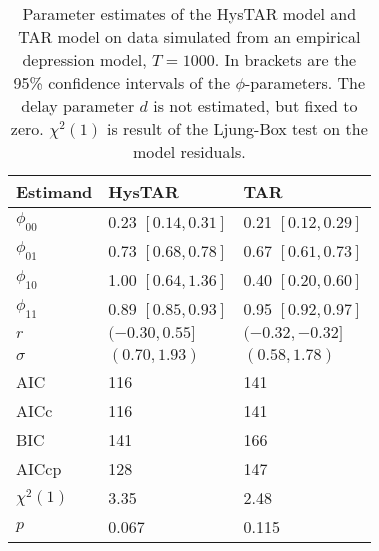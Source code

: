 \begin{table}[h!]
\begin{center}
\begin{tabular}{ l l l }
\hline
Estimand & HysTAR & TAR \\ \hline
$\phi_{00}$ 	& 0.23 $[0.14, 0.31]$ 	& 0.21 $[0.12, 0.29]$ 	\\
$\phi_{01}$ 	& 0.73 $[0.68, 0.78]$ 	& 0.67 $[0.61, 0.73]$ 	\\
$\phi_{10}$ 	& 1.00 $[0.64, 1.36]$ 	& 0.40 $[0.20, 0.60]$ 	\\
$\phi_{11}$ 	& 0.89 $[0.85, 0.93]$ 	& 0.95 $[0.92, 0.97]$ 	\\
$r$ 			& $(-0.30, 0.55]$ 		& $(-0.32, -0.32]$  		\\
$\sigma$ 	& $(0.70, 1.93)$ 		& $(0.58, 1.78)$  		\\ \hline
AIC  		& 116 					&  141  					\\
AICc 		& 116 					&  141 					\\
BIC  		& 141 					& 166  					\\
AICcp 		& 128 					& 147 					\\ \hline
$\chi^2(1)$ 	& 3.35 					& 2.48 		 			\\
$p$ 			& 0.067 					& 0.115 					\\
\hline
\end{tabular}
\caption{Parameter estimates of the HysTAR model and TAR model on data simulated from an empirical depression model, $T = 1000$. In brackets are the 95\% confidence intervals of the $\phi$-parameters. The delay parameter $d$ is not estimated, but fixed to zero. $\chi^2(1)$ is result of the Ljung-Box test on the model residuals.}
\label{tab:results_MD}
\end{center}
\end{table}